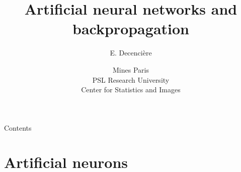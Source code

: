 \documentclass[xcolor=pdftex,dvipsnames,table,mathserif,aspectratio=169]{beamer}
\title{Artificial neural networks and backpropagation}
\author{E. Decencière}
\date{Mines Paris\\
  PSL Research University\\
  Center for Statistics and Images
}
\begin{document}
\begin{frame}
  \titlepage
\end{frame}



\begin{frame}{Contents}
  \tableofcontents
\end{frame}








\section{Artificial neurons}


\end{document}
